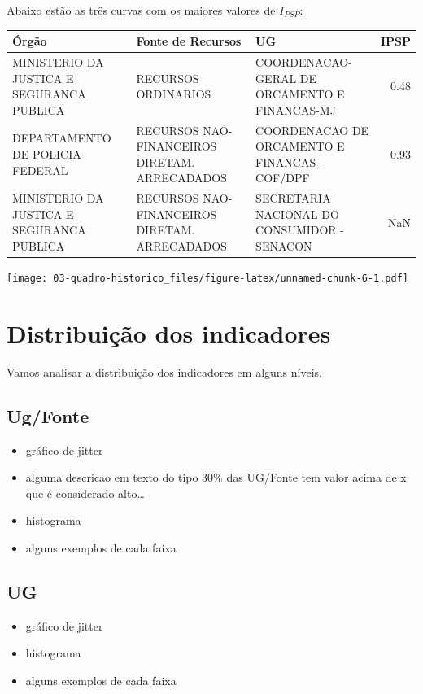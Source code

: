 \documentclass[
]{book}
\providecommand{\tightlist}{%
  \setlength{\itemsep}{0pt}\setlength{\parskip}{0pt}}
\begin{document}
Abaixo estão as três curvas com os maiores valores de \(I_{PSP}\):

\begin{tabular}{l|l|l|r}
\hline
Órgão & Fonte de Recursos & UG & IPSP\\
\hline
MINISTERIO DA JUSTICA E SEGURANCA PUBLICA & RECURSOS ORDINARIOS & COORDENACAO-GERAL DE ORCAMENTO E FINANCAS-MJ & 0.48\\
\hline
DEPARTAMENTO DE POLICIA FEDERAL & RECURSOS NAO-FINANCEIROS DIRETAM. ARRECADADOS & COORDENACAO DE ORCAMENTO E FINANCAS - COF/DPF & 0.93\\
\hline
MINISTERIO DA JUSTICA E SEGURANCA PUBLICA & RECURSOS NAO-FINANCEIROS DIRETAM. ARRECADADOS & SECRETARIA NACIONAL DO CONSUMIDOR - SENACON & NaN\\
\hline
\end{tabular}

\texttt{[image: 03-quadro-historico\_files/figure-latex/unnamed-chunk-6-1.pdf]}

\hypertarget{distribuiuxe7uxe3o-dos-indicadores}{%
\section{Distribuição dos indicadores}\label{distribuiuxe7uxe3o-dos-indicadores}}

Vamos analisar a distribuição dos indicadores em alguns níveis.

\hypertarget{ugfonte}{%
\subsection{Ug/Fonte}\label{ugfonte}}

\begin{itemize}
\tightlist
\item
  gráfico de jitter
\item
  alguma descricao em texto do tipo 30\% das UG/Fonte tem valor acima de x que é considerado alto\ldots{}
\item
  histograma
\item
  alguns exemplos de cada faixa
\end{itemize}

\hypertarget{ug}{%
\subsection{UG}\label{ug}}

\begin{itemize}
\tightlist
\item
  gráfico de jitter
\item
  histograma
\item
  alguns exemplos de cada faixa
\end{itemize}
\end{document}
